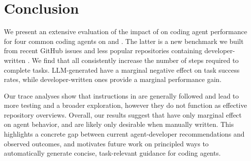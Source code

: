 \section{Conclusion}
\label{sec:conclusion}

We present an extensive evaluation of the impact of \agentsmds{} on coding agent performance for four common coding agents on \swebench{} and \planbench{}. The latter is a new benchmark we built from recent GitHub issues and less popular repositories containing developer-written \agentsmds{}. We find that all \agentsmds{} consistently increase the number of steps required to complete tasks. LLM-generated \agentsmds{} have a marginal negative effect on task success rates, while developer-written ones provide a marginal performance gain.

Our trace analyses show that instructions in \agentsmds{} are generally followed and lead to more testing and a broader exploration, however they do not function as effective repository overviews. 
Overall, our results suggest that \agentsmds{} have only marginal effect on agent behavior, and are likely only desirable when manually written. 
This highlights a concrete gap between current agent-developer recommendations and observed outcomes, and motivates future work on principled ways to automatically generate concise, task-relevant guidance for coding agents.
